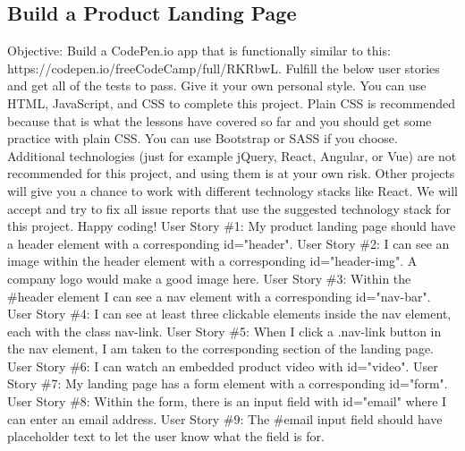 \documentclass{article}%
\begin{document}
\subsection{Build a Product Landing Page}%
\label{subsec:BuildaProductLandingPage}%
Objective: Build a CodePen.io app that is functionally similar to this: https://codepen.io/freeCodeCamp/full/RKRbwL.\newline%
Fulfill the below user stories and get all of the tests to pass. Give it your own personal style.\newline%
You can use HTML, JavaScript, and CSS to complete this project. Plain CSS is recommended because that is what the lessons have covered so far and you should get some practice with plain CSS. You can use Bootstrap or SASS if you choose. Additional technologies (just for example jQuery, React, Angular, or Vue) are not recommended for this project, and using them is at your own risk. Other projects will give you a chance to work with different technology stacks like React. We will accept and try to fix all issue reports that use the suggested technology stack for this project. Happy coding!\newline%
User Story \#1: My product landing page should have a header element with a corresponding id="header".\newline%
User Story \#2: I can see an image within the header element with a corresponding id="header{-}img". A company logo would make a good image here.\newline%
User Story \#3: Within the \#header element I can see a nav element with a corresponding id="nav{-}bar".\newline%
User Story \#4: I can see at least three clickable elements inside the nav element, each with the class nav{-}link.\newline%
User Story \#5: When I click a .nav{-}link button in the nav element, I am taken to the corresponding section of the landing page.\newline%
User Story \#6: I can watch an embedded product video with id="video".\newline%
User Story \#7: My landing page has a form element with a corresponding id="form".\newline%
User Story \#8: Within the form, there is an input field with id="email" where I can enter an email address.\newline%
User Story \#9: The \#email input field should have placeholder text to let the user know what the field is for.\newline%
\end{document}
